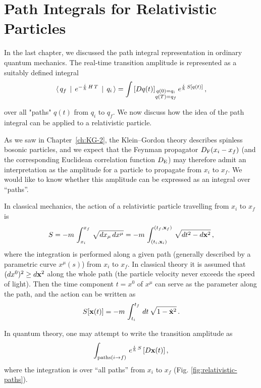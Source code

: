 \chapter{Path Integrals for Relativistic Particles}\label{ch:PI_rel}

In the last chapter, we discussed the path integral representation in ordinary quantum mechanics. The real-time transition amplitude is represented as a suitably defined integral
$$
\langle\,q_f\,\mid \,e^{-{i\over\hbar}\,H\,T}\,\mid \,q_i\,\rangle = \int\,[D q(t)]_{\substack{q(0)=q_i \\ q(T)=q_f}} \, e^{{i\over\hbar}\,S[q(t)]}\,,
$$

over all "paths" $q(t)$ from $q_i$ to $q_f$. We now discuss how the idea of the path integral can be applied to a relativistic particle.

As we saw in Chapter~\ref{ch:KG-2}, the Klein--Gordon theory describes spinless bosonic particles, and we expect that the Feynman propagator $D_{\rm F}(x_i-x_f)$ (and the corresponding Euclidean correlation function $D_{\rm E}$) may therefore admit an interpretation as the amplitude for a particle to propagate from $x_i$ to $x_f$. We would like to know whether this amplitude can be expressed as an integral over ``paths''.

In classical mechanics, the action of a relativistic particle travelling from $x_i$ to $x_f$ is
$$
S = -m\,\int_{x_i}^{x_f}\,\sqrt{dx_{\mu}\,dx^{\mu}} = -m\,\int_{(t_i, {\bf x}_i)}^{(t_f, {\bf x}_f)}\,\sqrt{dt^2 - d{\bf x}^2}\,,
$$
where the integration is performed along a given path (generally described by a parametric curve $x^{\mu}(s)$) from $x_i$ to $x_f$. In classical theory it is assumed that $(dx^{0})^2 \geq {d{\bf x}^2}$ along the whole path (the particle velocity never exceeds the speed of light). Then the time component $t = x^0$ of $x^{\mu}$ can serve as the parameter along the path, and the action can be written as
$$
S[{\bf x}(t)] = -m \,\int_{t_i}^{t_f}\,dt\,\sqrt{1 - {\dot{\bf x}}^2}\,.
$$

In quantum theory, one may attempt to write the transition amplitude as
$$
\int_{{\rm paths}(i\to f)}\,e^{{i\over\hbar}\,S}\,[D{\bf x}(t)]\,,
$$
where the integration is over ``all paths'' from $x_i$ to $x_f$ (Fig. \ref{fig:relativistic-paths}).


